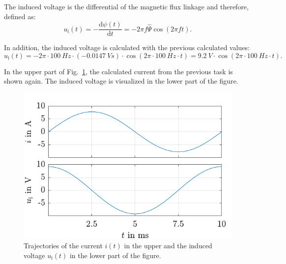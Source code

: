 \begin{solutionblock}
    The induced voltage is the differential of the magnetic flux linkage and therefore, defined as:
    \begin{equation}
        u_{\mathrm{i}}(t) = -\frac{\mathrm{d}\psi(t)}{\mathrm{d}t}
        = - 2 \pi f \mathit{\hat{\Psi}} \cos(2 \pi f t).
    \end{equation}

    In addition, the induced voltage is calculated with the previous calculated values:
    \begin{equation}
        u_{\mathrm{i}}(t) = -2 \pi \cdot 100 \ \si{Hz} \cdot (-0.0147 \ \si{Vs}) \cdot \cos(2 \pi \cdot 100 \ \si{Hz} \cdot t)
        = 9.2 \ \si{V} \cdot \cos(2 \pi \cdot 100 \ \si{Hz} \cdot t).
    \end{equation}

    In the upper part of Fig.~\ref{fig:solution_InducedVoltage}, the calculated current from the previous task is shown again. The induced voltage is visualized in the lower part of the figure. 
    \begin{figure}[ht]
        \centering
        \includegraphics{fig/ex01/solution_InducedVoltage.pdf}
        \caption{Trajectories of the current $i(t)$ in the upper and the induced voltage $u_{\mathrm{i}}(t)$ in the lower part of the figure.}
        \label{fig:solution_InducedVoltage}
    \end{figure}
    
\end{solutionblock}



